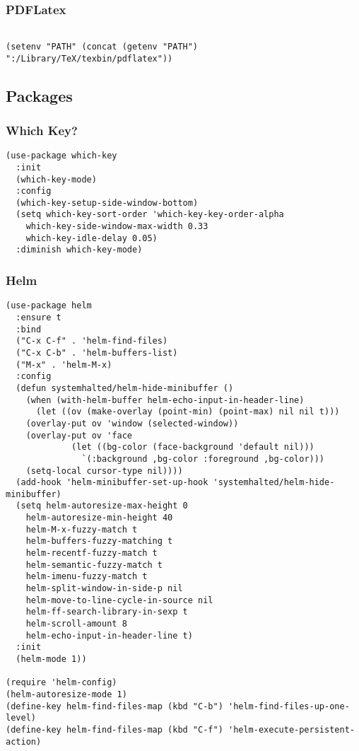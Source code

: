 \documentclass[11pt]{article}
\begin{document}
\subsubsection{PDFLatex}
\label{sec:org9627b37}

\begin{verbatim}

(setenv "PATH" (concat (getenv "PATH") ":/Library/TeX/texbin/pdflatex"))

\end{verbatim}


\subsection{Packages}
\label{sec:org08fa74a}
\subsubsection{Which Key?}
\label{sec:org4a98796}
\begin{verbatim}
(use-package which-key				   
  :init						   
  (which-key-mode)					   
  :config						   
  (which-key-setup-side-window-bottom)		   
  (setq which-key-sort-order 'which-key-key-order-alpha 
	which-key-side-window-max-width 0.33		   
	which-key-idle-delay 0.05)			   
  :diminish which-key-mode)				  
\end{verbatim}

\subsubsection{Helm}
\label{sec:org6b17ca5}

\begin{verbatim}
(use-package helm 
  :ensure t
  :bind
  ("C-x C-f" . 'helm-find-files)
  ("C-x C-b" . 'helm-buffers-list)
  ("M-x" . 'helm-M-x)
  :config
  (defun systemhalted/helm-hide-minibuffer ()
    (when (with-helm-buffer helm-echo-input-in-header-line)
      (let ((ov (make-overlay (point-min) (point-max) nil nil t)))
	(overlay-put ov 'window (selected-window))
	(overlay-put ov 'face
		     (let ((bg-color (face-background 'default nil)))
		       `(:background ,bg-color :foreground ,bg-color)))
	(setq-local cursor-type nil))))
  (add-hook 'helm-minibuffer-set-up-hook 'systemhalted/helm-hide-minibuffer)
  (setq helm-autoresize-max-height 0
	helm-autoresize-min-height 40
	helm-M-x-fuzzy-match t
	helm-buffers-fuzzy-matching t
	helm-recentf-fuzzy-match t
	helm-semantic-fuzzy-match t
	helm-imenu-fuzzy-match t
	helm-split-window-in-side-p nil
	helm-move-to-line-cycle-in-source nil
	helm-ff-search-library-in-sexp t
	helm-scroll-amount 8 
	helm-echo-input-in-header-line t)
  :init
  (helm-mode 1))

(require 'helm-config)    
(helm-autoresize-mode 1)
(define-key helm-find-files-map (kbd "C-b") 'helm-find-files-up-one-level)
(define-key helm-find-files-map (kbd "C-f") 'helm-execute-persistent-action)

\end{verbatim}
\end{document}
